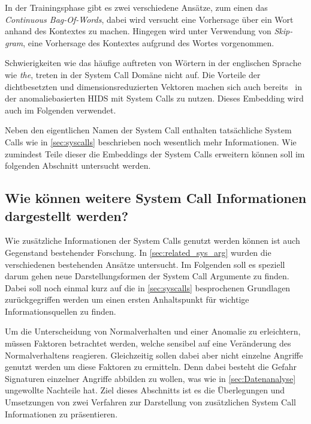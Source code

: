                 In der Trainingsphase gibt es zwei verschiedene Ansätze, zum einen das \textit{Continuous Bag-Of-Words},
                dabei wird versucht eine Vorhersage über ein Wort anhand des Kontextes zu machen.
                Hingegen wird unter Verwendung von \textit{Skip-gram}, eine Vorhersage des Kontextes aufgrund des Wortes vorgenommen.~\cite{EMBEDDINGPILEHVAR2020}

                Schwierigkeiten wie das häufige auftreten von Wörtern in der englischen Sprache wie \textit{the}, treten in der System Call Domäne nicht auf.
                Die Vorteile der dichtbesetzten und dimensionsreduzierten Vektoren machen sich auch bereits~\cite{IDSTHREADGRIMMER2021} in der anomaliebasierten \ac{HIDS} mit System Calls zu nutzen.
                Dieses Embedding wird auch im Folgenden verwendet.
                
            Neben den eigentlichen Namen der System Call enthalten tatsächliche System Calls wie in \autoref{sec:syscalls} beschrieben noch wesentlich mehr Informationen.
            Wie zumindest Teile dieser die Embeddings der System Calls erweitern können soll im folgenden Abschnitt untersucht werden.

            \subsection{Wie können weitere System Call Informationen dargestellt werden?}\label{sec:Meta}

                Wie zusätzliche Informationen der System Calls genutzt werden können ist auch Gegenstand bestehender Forschung.
                In \autoref{sec:related_sys_arg} wurden die verschiedenen bestehenden Ansätze untersucht.
                Im Folgenden soll es speziell darum gehen neue Darstellungsformen der System Call Argumente zu finden.
                Dabei soll noch einmal kurz auf die in \autoref{sec:syscalls} besprochenen Grundlagen zurückgegriffen werden um einen ersten Anhaltspunkt für wichtige Informationsquellen zu finden.

                Um die Unterscheidung von Normalverhalten und einer Anomalie zu erleichtern, müssen Faktoren betrachtet werden, welche sensibel auf eine Veränderung des Normalverhaltens reagieren.
                Gleichzeitig sollen dabei aber nicht einzelne Angriffe genutzt werden um diese Faktoren zu ermitteln.
                Denn dabei besteht die Gefahr Signaturen einzelner Angriffe abbilden zu wollen, was wie in \autoref{sec:Datenanalyse} ungewollte Nachteile hat.
                Ziel dieses Abschnitts ist es die Überlegungen und Umsetzungen von zwei Verfahren zur Darstellung von zusätzlichen System Call Informationen zu präsentieren.

